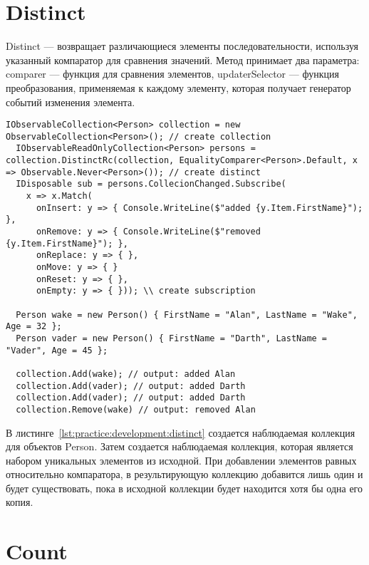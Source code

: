 \section{Distinct}
\label{sub:development:distinct}

Distinct --- возвращает различающиеся элементы последовательности, используя указанный компаратор для сравнения значений.
Метод принимает два параметра: comparer --- функция для сравнения элементов, updaterSelector --- функция преобразования, применяемая к каждому элементу, которая получает генератор событий изменения элемента.

\begin{lstlisting}[style=csharpinlinestyle, caption={Пример использования Distinct}, label=lst:practice:development:distinct]
  IObservableCollection<Person> collection = new ObservableCollection<Person>(); // create collection
  IObservableReadOnlyCollection<Person> persons = collection.DistinctRc(collection, EqualityComparer<Person>.Default, x => Observable.Never<Person>()); // create distinct
  IDisposable sub = persons.CollecionChanged.Subscribe(
    x => x.Match(
      onInsert: y => { Console.WriteLine($"added {y.Item.FirstName}"); },
      onRemove: y => { Console.WriteLine($"removed {y.Item.FirstName}"); },
      onReplace: y => { },
      onMove: y => { }
      onReset: y => { },
      onEmpty: y => { })); \\ create subscription

  Person wake = new Person() { FirstName = "Alan", LastName = "Wake", Age = 32 };
  Person vader = new Person() { FirstName = "Darth", LastName = "Vader", Age = 45 };

  collection.Add(wake); // output: added Alan
  collection.Add(vader); // output: added Darth
  collection.Add(vader); // output: added Darth
  collection.Remove(wake) // output: removed Alan

\end{lstlisting}

В листинге~\ref{lst:practice:development:distinct} создается наблюдаемая коллекция для объектов Person. Затем создается наблюдаемая коллекция, которая является набором уникальных элементов из исходной.
При добавлении элементов равных относительно компаратора, в результирующую коллекцию добавится лишь один и будет существовать, пока в исходной коллекции будет находится хотя бы одна его копия.

\section{Count}
\label{sub:development:count}

